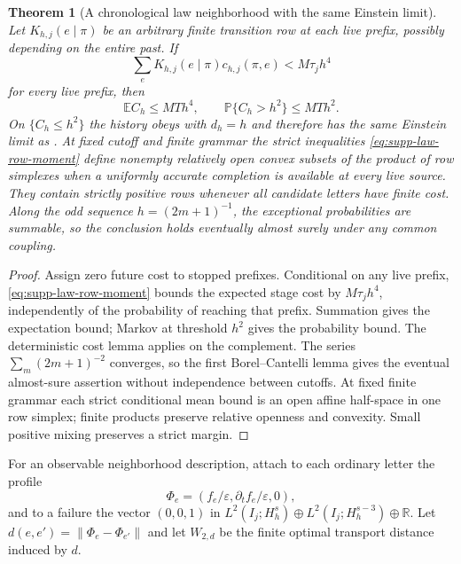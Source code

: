 \documentclass[11pt]{article}
\newtheorem{theorem}{Theorem}[section]
\theoremstyle{definition}
\theoremstyle{remark}
\begin{document}
\begin{theorem}[A chronological law neighborhood with the same Einstein limit]
\label{thm:supp-law-row-neighbourhood}
Let $K_{h,j}(e\mid\pi)$ be an arbitrary finite transition row at each live
prefix, possibly depending on the entire past.  If
\begin{equation}
 \sum_eK_{h,j}(e\mid\pi)c_{h,j}(\pi,e)<M\tau_jh^4
 \label{eq:supp-law-row-moment}
\end{equation}
for every live prefix, then
\begin{equation}
 \boxed{\mathbb EC_h\le MTh^4,
 \qquad\mathbb P\{C_h>h^2\}\le MTh^2.}
 \label{eq:supp-law-row-probability}
\end{equation}
On $\{C_h\le h^2\}$ the history obeys
 with $d_h=h$ and therefore has the same
Einstein limit as .  At fixed cutoff and finite
grammar the strict inequalities \eqref{eq:supp-law-row-moment} define
nonempty relatively open convex subsets of the product of row simplexes when
a uniformly accurate completion is available at every live source.  They
contain strictly positive rows whenever all candidate letters have finite
cost.  Along the odd sequence $h=(2m+1)^{-1}$, the exceptional probabilities
are summable, so the conclusion holds eventually almost surely under any
common coupling.
\end{theorem}
\begin{proof}
Assign zero future cost to stopped prefixes.  Conditional on any live prefix,
\eqref{eq:supp-law-row-moment} bounds the expected stage cost by
$M\tau_jh^4$, independently of the probability of reaching that prefix.
Summation gives the expectation bound; Markov at threshold $h^2$ gives the
probability bound.  The deterministic cost lemma applies on the complement.
The series $\sum_m(2m+1)^{-2}$ converges, so the first Borel--Cantelli lemma
gives the eventual almost-sure assertion without independence between
cutoffs.  At fixed finite grammar each strict conditional mean bound is an
open affine half-space in one row simplex; finite products preserve relative
openness and convexity.  Small positive mixing preserves a strict margin.
\end{proof}

For an observable neighborhood description, attach to each ordinary letter
the profile
\begin{equation}
 \Phi_e=(f_e/\varepsilon,\partial_tf_e/\varepsilon,0),
 \label{eq:supp-law-profile}
\end{equation}
and to a failure the vector $(0,0,1)$ in
$L^2(I_j;H_h^s)\oplus L^2(I_j;H_h^{s-3})\oplus\mathbb R$.  Let
$d(e,e')=\|\Phi_e-\Phi_{e'}\|$ and let $W_{2,d}$ be the finite optimal
transport distance induced by $d$.
\end{document}
